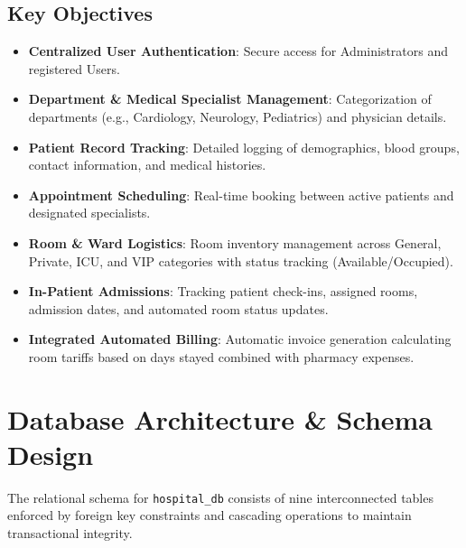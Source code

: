 \documentclass[12pt, a4paper]{article}
\begin{document}
\subsection{Key Objectives}
\begin{itemize}
    \item \textbf{Centralized User Authentication}: Secure access for Administrators and registered Users.
    \item \textbf{Department \& Medical Specialist Management}: Categorization of departments (e.g., Cardiology, Neurology, Pediatrics) and physician details.
    \item \textbf{Patient Record Tracking}: Detailed logging of demographics, blood groups, contact information, and medical histories.
    \item \textbf{Appointment Scheduling}: Real-time booking between active patients and designated specialists.
    \item \textbf{Room \& Ward Logistics}: Room inventory management across General, Private, ICU, and VIP categories with status tracking (Available/Occupied).
    \item \textbf{In-Patient Admissions}: Tracking patient check-ins, assigned rooms, admission dates, and automated room status updates.
    \item \textbf{Integrated Automated Billing}: Automatic invoice generation calculating room tariffs based on days stayed combined with pharmacy expenses.
\end{itemize}

\section{Database Architecture \& Schema Design}
The relational schema for \texttt{hospital\_db} consists of nine interconnected tables enforced by foreign key constraints and cascading operations to maintain transactional integrity.
\end{document}
